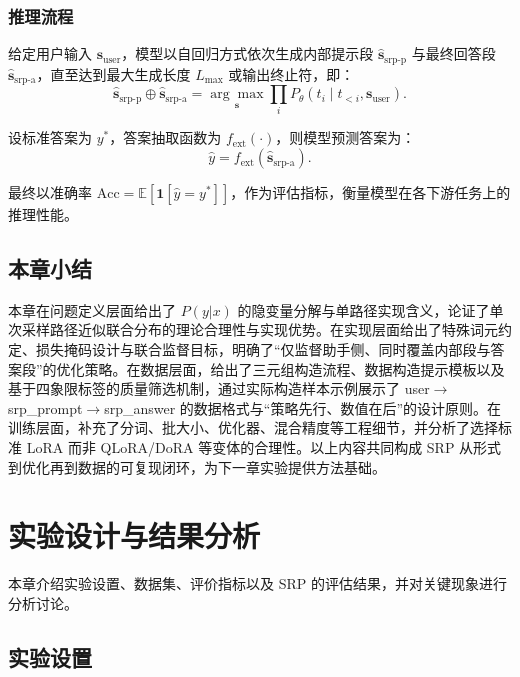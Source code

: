 \subsection{推理流程}

给定用户输入 $\mathbf{s}_{\text{user}}$，模型以自回归方式依次生成内部提示段 $\hat{\mathbf{s}}_{\text{srp-p}}$ 与最终回答段 $\hat{\mathbf{s}}_{\text{srp-a}}$，直至达到最大生成长度 $L_{\max}$ 或输出终止符，即：
\begin{equation}
    \hat{\mathbf{s}}_{\text{srp-p}} \oplus \hat{\mathbf{s}}_{\text{srp-a}} = \underset{\mathbf{s}}{\arg\max} \prod_{i} P_{\theta}(t_i \mid t_{<i}, \mathbf{s}_{\text{user}})\text{.}
\end{equation}

设标准答案为 $y^*$，答案抽取函数为 $f_{\text{ext}}(\cdot)$，则模型预测答案为：
\begin{equation}
    \hat{y} = f_{\text{ext}}(\hat{\mathbf{s}}_{\text{srp-a}})\text{.}
\end{equation}

最终以准确率 $\mathrm{Acc} = \mathbb{E}\left[\mathbf{1}[\hat{y} = y^*]\right]$，作为评估指标，衡量模型在各下游任务上的推理性能。

\section{本章小结}

本章在问题定义层面给出了 $P(y|x)$ 的隐变量分解与单路径实现含义，论证了单次采样路径近似联合分布的理论合理性与实现优势。在实现层面给出了特殊词元约定、损失掩码设计与联合监督目标，明确了“仅监督助手侧、同时覆盖内部段与答案段”的优化策略。在数据层面，给出了三元组构造流程、数据构造提示模板以及基于四象限标签的质量筛选机制，通过实际构造样本示例展示了 user$\rightarrow$srp\_prompt$\rightarrow$srp\_answer 的数据格式与“策略先行、数值在后”的设计原则。在训练层面，补充了分词、批大小、优化器、混合精度等工程细节，并分析了选择标准 LoRA 而非 QLoRA/DoRA 等变体的合理性。以上内容共同构成 SRP 从形式到优化再到数据的可复现闭环，为下一章实验提供方法基础。

\chapter{实验设计与结果分析}

本章介绍实验设置、数据集、评价指标以及 SRP 的评估结果，并对关键现象进行分析讨论。

\section{实验设置}

